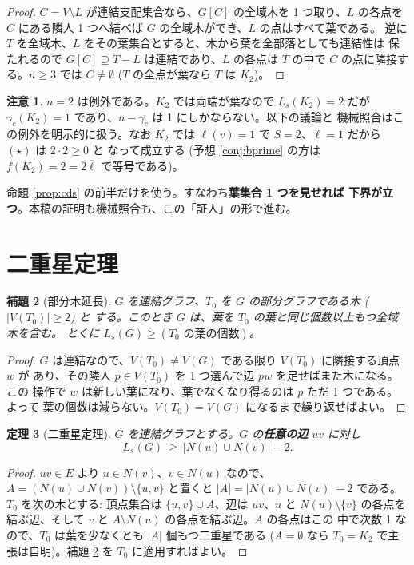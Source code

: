 \documentclass[paper=a4,fontsize=10.5pt,jafontsize=10.5pt]{jlreq}
\theoremstyle{plain}
\newtheorem{theorem}{定理}[section]
\newtheorem{lemma}[theorem]{補題}
\theoremstyle{definition}
\newtheorem{remark}[theorem]{注意}
\begin{document}
\begin{proof}
$C = V \setminus L$ が連結支配集合なら、$G[C]$ の全域木を 1 つ取り、$L$ の各点を
$C$ にある隣人 1 つへ結べば $G$ の全域木ができ、$L$ の点はすべて葉である。
逆に $T$ を全域木、$L$ をその葉集合とすると、木から葉を全部落としても連結性は
保たれるので $G[C] \supseteq T - L$ は連結であり、$L$ の各点は $T$ の中で
$C$ の点に隣接する。$n \ge 3$ では $C \ne \emptyset$ ($T$ の全点が葉なら
$T$ は $K_2$)。
\end{proof}

\begin{remark}
$n = 2$ は例外である。$K_2$ では両端が葉なので $L_s(K_2) = 2$ だが
$\gamma_c(K_2) = 1$ であり、$n - \gamma_c$ は 1 にしかならない。以下の議論と
機械照合はこの例外を明示的に扱う。なお $K_2$ では $\ell(v) = 1$ で
$S = 2$、$\overline{\ell} = 1$ だから $(\star)$ は $2 \cdot 2 \ge 0$ と
なって成立する (予想 \ref{conj:bprime} の方は $f(K_2) = 2 = 2\overline{\ell}$
で等号である)。
\end{remark}

命題 \ref{prop:cds} の前半だけを使う。すなわち\textbf{葉集合 1 つを見せれば
下界が立つ}。本稿の証明も機械照合も、この「証人」の形で進む。

\section{二重星定理}\label{sec:doublestar}

\begin{lemma}[部分木延長]\label{lem:extend}
$G$ を連結グラフ、$T_0$ を $G$ の部分グラフである木 ($|V(T_0)| \ge 2$) と
する。このとき $G$ は、葉を $T_0$ の葉と同じ個数以上もつ全域木を含む。
とくに $L_s(G) \ge (\text{$T_0$ の葉の個数})$。
\end{lemma}

\begin{proof}
$G$ は連結なので、$V(T_0) \ne V(G)$ である限り $V(T_0)$ に隣接する頂点 $w$ が
あり、その隣人 $p \in V(T_0)$ を 1 つ選んで辺 $pw$ を足せばまた木になる。この
操作で $w$ は新しい葉になり、葉でなくなり得るのは $p$ ただ 1 つである。よって
葉の個数は減らない。$V(T_0) = V(G)$ になるまで繰り返せばよい。
\end{proof}

\begin{theorem}[二重星定理]\label{thm:doublestar}
$G$ を連結グラフとする。$G$ の\textbf{任意の辺} $uv$ に対し
\[ L_s(G) \ \ge \ |N(u) \cup N(v)| - 2 . \]
\end{theorem}

\begin{proof}
$uv \in E$ より $u \in N(v)$、$v \in N(u)$ なので、
$A = (N(u) \cup N(v)) \setminus \{u, v\}$ と置くと
$|A| = |N(u) \cup N(v)| - 2$ である。$T_0$ を次の木とする: 頂点集合は
$\{u, v\} \cup A$、辺は $uv$、$u$ と $N(u) \setminus \{v\}$ の各点を
結ぶ辺、そして $v$ と $A \setminus N(u)$ の各点を結ぶ辺。$A$ の各点はこの
中で次数 1 なので、$T_0$ は葉を少なくとも $|A|$ 個もつ二重星である
($A = \emptyset$ なら $T_0 = K_2$ で主張は自明)。補題 \ref{lem:extend} を
$T_0$ に適用すればよい。
\end{proof}
\end{document}
